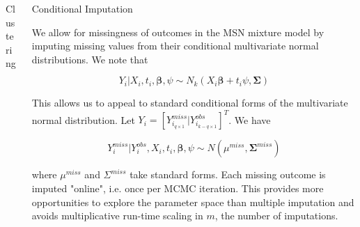 \documentclass[final]{beamer}
\newlength{\onecolwid}
\newlength{\twocolwid}
\begin{document}
\begin{frame}[t]
\begin{columns}[t]
\begin{column}{\twocolwid}
\begin{columns}[t,totalwidth=\twocolwid]
\begin{column}{\onecolwid}
\begin{block}{Clustering}
\end{block}


\end{column} %

\begin{column}{\onecolwid}\vspace{-.6in} %


\begin{block}{Conditional Imputation}

We allow for missingness of outcomes in the MSN mixture model by imputing missing values from their conditional multivariate normal distributions. We note that

$$Y_i|X_i,t_i,\boldsymbol\beta,\psi \sim N_k(X_i \boldsymbol\beta + t_i \psi, \boldsymbol\Sigma)$$

This allows us to appeal to standard conditional forms of the multivariate normal distribution. Let $Y_i = [Y^{miss}_{i_{q \times 1}} | Y^{obs}_{i_{k - q \times 1}}]^T$. We have

$$Y_i^{miss}|Y_i^{obs},X_i,t_i,\boldsymbol\beta,\psi \sim N(\mu^{miss},\boldsymbol\Sigma^{miss})$$

where $\mu^{miss}$ and $\Sigma^{miss}$ take standard forms. Each missing outcome is imputed "online", i.e. once per MCMC iteration. This provides more opportunities to explore the parameter space than multiple imputation and avoids multiplicative run-time scaling in $m$, the number of imputations.

\end{block}


\end{column} %

\end{columns} %



\end{column}
\end{columns}
\end{frame}
\end{document}
